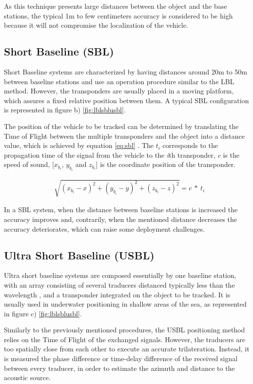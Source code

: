 As this technique presents large distances between the object and the base stations, the typical 1m to few centimeters accuracy is considered to be high because it will not compromise the localization of the vehicle. 


\subsection{Short Baseline (SBL)}

Short Baseline systems are characterized by having distances around 20m to 50m between baseline stations \cite{survey-tech-chall} and use an operation procedure similar to the LBL method. However, the transponders are usually placed in a moving platform, which assures a fixed relative position between them. A typical SBL configuration is represented in figure b) \ref{fig:lblsblusbl}.

The position of the vehicle to be tracked can be determined by translating the Time of Flight between the multiple transponders and the object into a distance value, which is achieved by equation \ref{eq:sbl} \cite{sbl}. The $t_{i}$ corresponds to the propagation time of the signal from the vehicle to the \textit{i}th transponder, \textit{c} is the speed of sound, [$x_{b_{i}}$, $y_{b_{i}}$ and $z_{b_{i}}$] is the coordinate position of the transponder.

\begin{eqnarray}
&\sqrt{ (x_{b_{i}}-x)^2 + (y_{b_{i}}-y)^2 + (z_{b_{i}}-z)^2 } = c\ *\ t_{i}
\label{eq:sbl}
\end{eqnarray}

In a SBL system, when the distance between baseline stations is increased the accuracy improves and, contrarily, when the mentioned distance decreases the accuracy deteriorates, which can raise some deployment challenges.

\subsection{Ultra Short Baseline (USBL)}

Ultra short baseline systems are composed essentially by one baseline station, with an array consisting of several traducers distanced typically less than the wavelength \cite{lblsblusbl}, and a transponder integrated on the object to be tracked. It is usually used in underwater positioning in shallow areas of the sea, as represented in figure c) \ref{fig:lblsblusbl}.

Similarly to the previously mentioned procedures, the USBL positioning method relies on the Time of Flight of the exchanged signals. However, the traducers are too spatially close from each other to execute an accurate trilateration. Instead, it is measured the phase difference or time-delay difference of the received signal between every traducer, in order to estimate the azimuth and distance to the acoustic source. 

